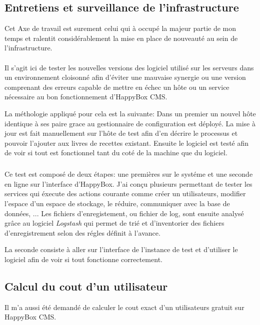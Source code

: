 \documentclass[11pt, a4paper ]{article}
\begin{document}
\begin{spacing}{1.5}
\subsection{Entretiens et surveillance de l'infrastructure}

Cet Axe de travail est surement celui qui à occupé la majeur partie de mon temps et ralentit considérablement la mise en place de nouveauté au sein de l'infrastructure. 

\paragraph{}
Il s'agit ici de tester les nouvelles versions des logiciel utilisé sur les serveurs dans un environnement cloisonné afin d'éviter une mauvaise synergie ou une version comprenant des erreurs capable de mettre en échec un hôte ou un service nécessaire au bon fonctionnement d'HappyBox CMS.

La méthologie appliqué pour cela est la suivante: 
Dans un premier un nouvel hôte identique à ses paire grace au gestionnaire de configuration est déployé. La mise à jour est fait manuellement sur l'hôte de test afin d'en décrire le processus et pouvoir l'ajouter aux livres de recettes existant. 
Ensuite le logiciel est testé afin de voir si tout est fonctionnel tant du coté de la machine que du logiciel. 

\subparagraph{}
Ce test est composé de deux étapes: une premières sur le systéme et une seconde en ligne sur l'interface d'HappyBox. J'ai conçu plusieurs permettant de tester les services qui éxecute des actions courante comme créer un utilisateurs, modifier l'espace d'un espace de stockage, le réduire, communiquer avec la base de données, ...
Les fichiers d'enregistement, ou fichier de log, sont ensuite analysé grâce au logiciel \emph{Logstash} qui permet de trié et d'inventorier des fichiers d'enregistrement selon des régles définit à l'avance.

La seconde consiste à aller sur l'interface de l'instance de test et d'utiliser le logiciel afin de voir si tout fonctionne correctement.


\subsection{Calcul du cout d'un utilisateur}

Il m'a aussi été demandé de calculer le cout exact d'un utilisateurs gratuit sur HappyBox CMS. 




\end{spacing}
\end{document}
